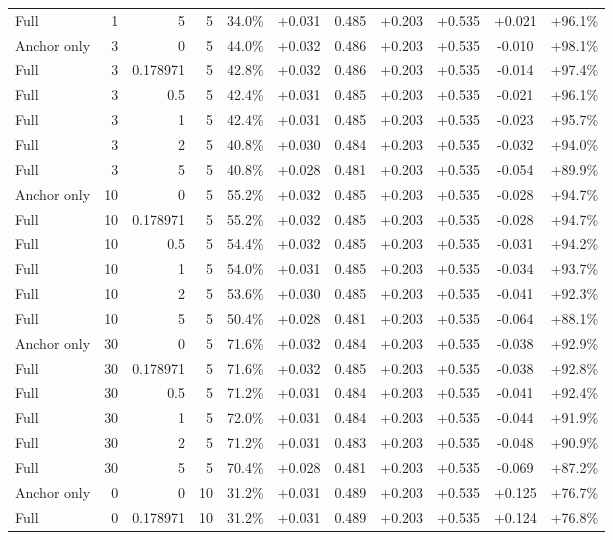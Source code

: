 \begin{table}[htbp]
\begin{tabular}{lrrrccccccc}
Full & 1 & 5 & 5 & 34.0\% & +0.031 & 0.485 & +0.203 & +0.535 & +0.021 & +96.1\% \\
Anchor only & 3 & 0 & 5 & 44.0\% & +0.032 & 0.486 & +0.203 & +0.535 & -0.010 & +98.1\% \\
Full & 3 & 0.178971 & 5 & 42.8\% & +0.032 & 0.486 & +0.203 & +0.535 & -0.014 & +97.4\% \\
Full & 3 & 0.5 & 5 & 42.4\% & +0.031 & 0.485 & +0.203 & +0.535 & -0.021 & +96.1\% \\
Full & 3 & 1 & 5 & 42.4\% & +0.031 & 0.485 & +0.203 & +0.535 & -0.023 & +95.7\% \\
Full & 3 & 2 & 5 & 40.8\% & +0.030 & 0.484 & +0.203 & +0.535 & -0.032 & +94.0\% \\
Full & 3 & 5 & 5 & 40.8\% & +0.028 & 0.481 & +0.203 & +0.535 & -0.054 & +89.9\% \\
Anchor only & 10 & 0 & 5 & 55.2\% & +0.032 & 0.485 & +0.203 & +0.535 & -0.028 & +94.7\% \\
Full & 10 & 0.178971 & 5 & 55.2\% & +0.032 & 0.485 & +0.203 & +0.535 & -0.028 & +94.7\% \\
Full & 10 & 0.5 & 5 & 54.4\% & +0.032 & 0.485 & +0.203 & +0.535 & -0.031 & +94.2\% \\
Full & 10 & 1 & 5 & 54.0\% & +0.031 & 0.485 & +0.203 & +0.535 & -0.034 & +93.7\% \\
Full & 10 & 2 & 5 & 53.6\% & +0.030 & 0.485 & +0.203 & +0.535 & -0.041 & +92.3\% \\
Full & 10 & 5 & 5 & 50.4\% & +0.028 & 0.481 & +0.203 & +0.535 & -0.064 & +88.1\% \\
Anchor only & 30 & 0 & 5 & 71.6\% & +0.032 & 0.484 & +0.203 & +0.535 & -0.038 & +92.9\% \\
Full & 30 & 0.178971 & 5 & 71.6\% & +0.032 & 0.485 & +0.203 & +0.535 & -0.038 & +92.8\% \\
Full & 30 & 0.5 & 5 & 71.2\% & +0.031 & 0.484 & +0.203 & +0.535 & -0.041 & +92.4\% \\
Full & 30 & 1 & 5 & 72.0\% & +0.031 & 0.484 & +0.203 & +0.535 & -0.044 & +91.9\% \\
Full & 30 & 2 & 5 & 71.2\% & +0.031 & 0.483 & +0.203 & +0.535 & -0.048 & +90.9\% \\
Full & 30 & 5 & 5 & 70.4\% & +0.028 & 0.481 & +0.203 & +0.535 & -0.069 & +87.2\% \\
Anchor only & 0 & 0 & 10 & 31.2\% & +0.031 & 0.489 & +0.203 & +0.535 & +0.125 & +76.7\% \\
Full & 0 & 0.178971 & 10 & 31.2\% & +0.031 & 0.489 & +0.203 & +0.535 & +0.124 & +76.8\% \\

\end{tabular}
\end{table}
